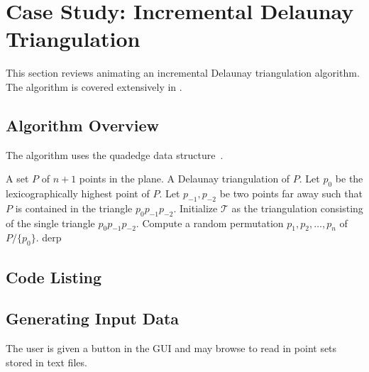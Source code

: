 \FloatBarrier
\section{Case Study: Incremental Delaunay Triangulation}

This section reviews animating an incremental Delaunay triangulation algorithm.
The algorithm is covered extensively in \cite{de2000computational}.  

\subsection{Algorithm Overview}

The algorithm uses the quadedge data structure~\cite{guibas1985primitives}.

\begin{mdframed}[linecolor=white, backgroundcolor=algback, frametitle={Algorithm
Delaunay}] \begin{algorithmic}[1]
    \Require A set $P$ of $n+1$ points in the plane.
    \Ensure A Delaunay triangulation of $P$.
    \vspace{0.75em}
    \State Let $p_0$ be the lexicographically highest point of $P$.
    \State Let $p_{-1}, p_{-2}$ be two points far away such that $P$ is
    contained in the triangle $p_0p_{-1}p_{-2}$.
    \State Initialize $\mathcal{T}$ as the triangulation consisting of the
    single triangle $p_0p_{-1}p_{-2}$.
    \State Compute a random permutation $p_1, p_2, \ldots, p_n$ of $P /
    \{p_0\}$.
   \State derp
    \EndFor \EndProcedure
\end{algorithmic}
\end{mdframed} 

\subsection{Code Listing}



\subsection{Generating Input Data}

The user is given a button in the GUI and may browse to read in point sets
stored in text files.
